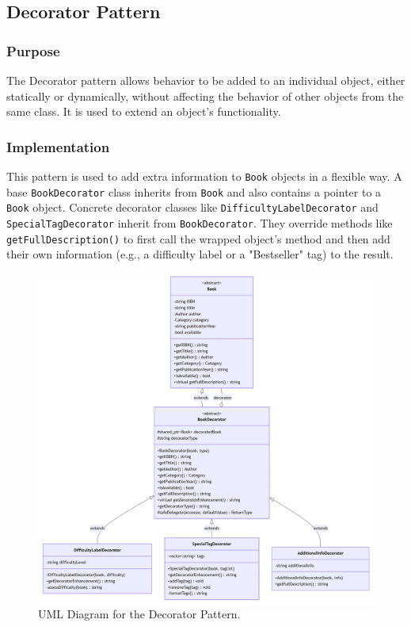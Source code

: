 \newpage

\subsection{Decorator Pattern}
\subsubsection{Purpose}
The Decorator pattern allows behavior to be added to an individual object, either statically or dynamically, without affecting the behavior of other objects from the same class. It is used to extend an object's functionality.

\subsubsection{Implementation}
This pattern is used to add extra information to \texttt{Book} objects in a flexible way. A base \texttt{BookDecorator} class inherits from \texttt{Book} and also contains a pointer to a \texttt{Book} object. Concrete decorator classes like \texttt{DifficultyLabelDecorator} and \texttt{SpecialTagDecorator} inherit from \texttt{BookDecorator}. They override methods like \texttt{getFullDescription()} to first call the wrapped object's method and then add their own information (e.g., a difficulty label or a "Bestseller" tag) to the result.

\begin{figure}[H]
    \centering
    \includegraphics[width=\textwidth]{figures/decorator_pattern.png}
    \caption{UML Diagram for the Decorator Pattern.}
    \label{fig:decorator_pattern}
\end{figure}

